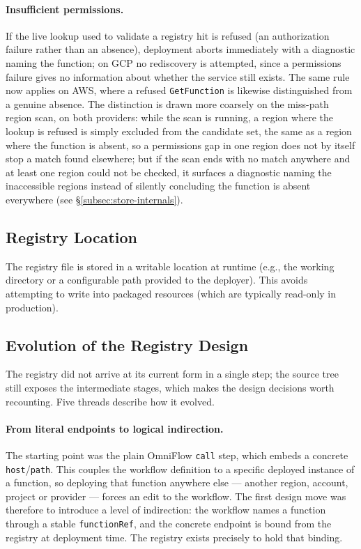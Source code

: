 \paragraph{Insufficient permissions.}
If the live lookup used to validate a registry hit is refused (an authorization failure rather
than an absence), deployment aborts immediately with a diagnostic naming the function; on GCP no
rediscovery is attempted, since a permissions failure gives no information about whether the
service still exists. The same rule now applies on AWS, where a refused \texttt{GetFunction} is
likewise distinguished from a genuine absence. The distinction is drawn more coarsely on the
miss-path region scan, on both providers: while the scan is running, a region where the lookup is
refused is simply excluded from the candidate set, the same as a region where the function is
absent, so a permissions gap in one region does not by itself stop a match found elsewhere; but if
the scan ends with no match anywhere and at least one region could not be checked, it surfaces a
diagnostic naming the inaccessible regions instead of silently concluding the function is absent
everywhere (see \S\ref{subsec:store-internals}).

\subsection{Registry Location}
The registry file is stored in a writable location at runtime (e.g., the working directory or a configurable path provided to the deployer). This avoids attempting to write into packaged resources (which are typically read-only in production).

\subsection{Evolution of the Registry Design}
\label{subsec:registry-evolution}

The registry did not arrive at its current form in a single step; the source tree still exposes
the intermediate stages, which makes the design decisions worth recounting. Five threads describe
how it evolved.

\paragraph{From literal endpoints to logical indirection.}
The starting point was the plain OmniFlow \texttt{call} step, which embeds a concrete
\texttt{host}/\texttt{path}. This couples the workflow definition to a specific deployed instance
of a function, so deploying that function anywhere else --- another region, account, project or
provider --- forces an edit to the workflow. The
first design move was therefore to introduce a level of indirection: the workflow names a function
through a stable \texttt{functionRef}, and the concrete endpoint is bound from the registry at
deployment time. The registry exists precisely to hold that binding.

